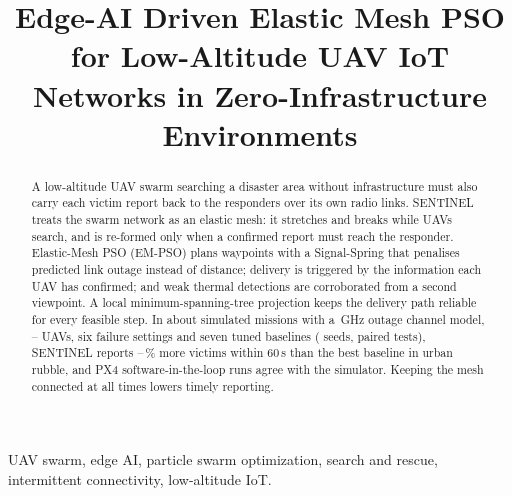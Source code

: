 \documentclass[conference]{IEEEtran}
\begin{document}
\title{Edge-AI Driven Elastic Mesh PSO for Low-Altitude UAV IoT Networks in Zero-Infrastructure Environments}

\author{
\and
{}
\and
{}
}

\maketitle

\begin{abstract}
A low-altitude UAV swarm searching a disaster area without infrastructure must also carry each
victim report back to the responders over its own radio links. SENTINEL treats the swarm network as
an elastic mesh: it stretches and breaks while UAVs search, and is re-formed only when a confirmed
report must reach the responder. Elastic-Mesh PSO (EM-PSO) plans waypoints with a Signal-Spring that
penalises predicted link outage instead of distance; delivery is triggered by the information each UAV
has confirmed; and weak thermal detections are corroborated from a second viewpoint. A local
minimum-spanning-tree projection keeps the delivery path reliable for every feasible step. In about
\nMissions{} simulated missions with a \nFreq\,GHz outage channel model, \nEoneNmin--\nEoneNmax{} UAVs, six failure
settings and seven tuned baselines (\nSeeds{} seeds, paired tests), SENTINEL reports \nEthreeGainLo--\nEthreeGainHi\,\%
more victims within 60\,s than the best baseline in urban rubble, and PX4 software-in-the-loop runs
agree with the simulator. Keeping the mesh connected at all times lowers timely reporting.
\end{abstract}

\begin{IEEEkeywords}
UAV swarm, edge AI, particle swarm optimization, search and rescue, intermittent connectivity,
low-altitude IoT.
\end{IEEEkeywords}
\end{document}
